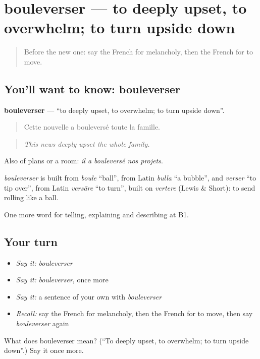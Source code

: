 \section[bouleverser]{bouleverser — to deeply upset, to overwhelm; to turn upside down}

\label{lesson:FR-C472-bouleverser}



\begin{quote}
Before the new one: say the French for melancholy, then the French for to move.
\end{quote}

\subsection*{You'll want to know: bouleverser}
\textbf{bouleverser} — \textquotedblleft{}to deeply upset, to overwhelm; to turn upside down\textquotedblright{}.

\begin{quote}
Cette nouvelle a bouleversé toute la famille.
\end{quote}

\begin{quote}
\emph{This news deeply upset the whole family.}
\end{quote}

Also of plans or a room: \emph{il a bouleversé nos projets}.

\begin{cousinweb}
\emph{bouleverser} is built from \emph{boule} \textquotedblleft{}ball\textquotedblright{}, from Latin \emph{bulla} \textquotedblleft{}a bubble\textquotedblright{}, and \emph{verser} \textquotedblleft{}to tip over\textquotedblright{}, from Latin \emph{versāre} \textquotedblleft{}to turn\textquotedblright{}, built on \emph{vertere} (Lewis \& Short): to send rolling like a ball.
\end{cousinweb}

\begin{grammarlens}[title={What you've built}]
One more word for telling, explaining and describing at B1.
\end{grammarlens}

\subsection*{Your turn}
\begin{itemize}
\raggedright
  \item \emph{Say it:} \emph{bouleverser}
  \item \emph{Say it:} \emph{bouleverser}, once more
  \item \emph{Say it:} a sentence of your own with \emph{bouleverser}
  \item \emph{Recall:} say the French for melancholy, then the French for to move, then say \emph{bouleverser} again
\end{itemize}

\begin{tcolorbox}[breakable,colback=teal!4,colframe=teal!35!black,title={Before you move on}]
What does bouleverser mean? (\textquotedblleft{}To deeply upset, to overwhelm; to turn upside down\textquotedblright{}.) Say it once more.
\end{tcolorbox}
